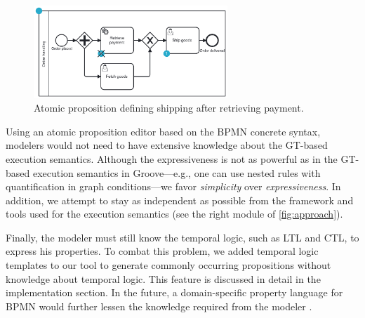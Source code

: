 \documentclass{lmcs} %
\begin{document}
\begin{figure}[ht]
    \centering
    \includegraphics[width=0.65\textwidth]{images/shippingAfterPayment.pdf}
    \caption{Atomic proposition defining shipping after retrieving payment.}
    \label{fig:shippingAfterPayment}
\end{figure}


Using an atomic proposition editor based on the BPMN concrete syntax, modelers would not need to have extensive knowledge about the GT-based execution semantics. 
Although the expressiveness is not as powerful as in the GT-based execution semantics in Groove---e.g., one can use nested rules with quantification in graph conditions---we favor \textit{simplicity} over \textit{expressiveness}.
In addition, we attempt to stay as independent as possible from the framework and tools used for the execution semantics (see the right module of \autoref{fig:approach}).

Finally, the modeler must still know the temporal logic, such as LTL and CTL, to express his properties.
To combat this problem, we added temporal logic templates to our tool to generate commonly occurring propositions without knowledge about temporal logic.
This feature is discussed in detail in the implementation section.
In the future, a domain-specific property language for BPMN would further lessen the knowledge required from the modeler \cite{meyersProMoBoxFrameworkGenerating2014}.
\end{document}
